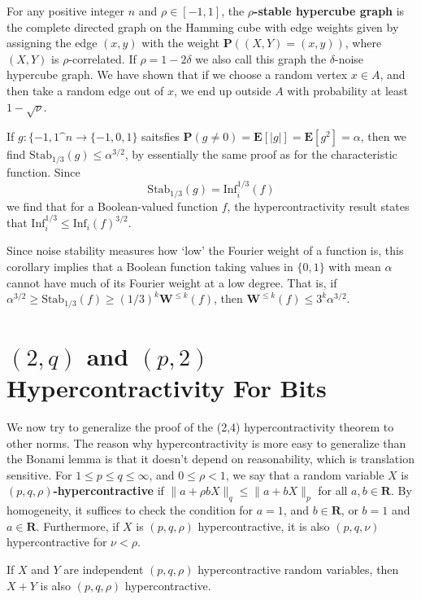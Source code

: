 \begin{example}
    For any positive integer $n$ and $\rho \in [-1,1]$, the {\bf $\rho$-stable hypercube graph} is the complete directed graph on the Hamming cube with edge weights given by assigning the edge $(x,y)$ with the weight $\mathbf{P}((X,Y) = (x,y))$, where $(X,Y)$ is $\rho$-correlated. If $\rho = 1 - 2\delta$ we also call this graph the $\delta$-noise hypercube graph. We have shown that if we choose a random vertex $x \in A$, and then take a random edge out of $x$, we end up outside $A$ with probability at least $1 - \sqrt{\nu}$.
\end{example}

If $g: \{ -1, 1 \^n \to \{ -1, 0 ,1 \}$ saitsfies $\mathbf{P}(g \neq 0) = \mathbf{E}[|g|] = \mathbf{E}[g^2] = \alpha$, then we find $\text{Stab}_{1/3}(g) \leq \alpha^{3/2}$, by essentially the same proof as for the characteristic function. Since
%
\[ \text{Stab}_{1/3}(g) = \text{Inf}_i^{1/3}(f) \]
%
we find that for a Boolean-valued function $f$, the hypercontractivity result states that $\text{Inf}_i^{1/3} \leq \text{Inf}_i(f)^{3/2}$.

Since noise stability measures how `low' the Fourier weight of a function is, this corollary implies that a Boolean function taking values in $\{ 0, 1 \}$ with mean $\alpha$ cannot have much of its Fourier weight at a low degree. That is, if $\alpha^{3/2} \geq \text{Stab}_{1/3}(f) \geq (1/3)^k \mathbf{W}^{\leq k}(f)$, then $\mathbf{W}^{\leq k}(f) \leq 3^k \alpha^{3/2}$.

\section{$(2,q)$ and $(p,2)$ Hypercontractivity For Bits}

We now try to generalize the proof of the (2,4) hypercontractivity theorem to other norms. The reason why hypercontractivity is more easy to generalize than the Bonami lemma is that it doesn't depend on reasonability, which is translation sensitive. For $1 \leq p \leq q \leq \infty$, and $0 \leq \rho < 1$, we say that a random variable $X$ is {\bf $(p,q,\rho)$-hypercontractive} if $\| a + \rho b X \|_q \leq \| a + b X \|_p$ for all $a,b \in \mathbf{R}$. By homogeneity, it suffices to check the condition for $a = 1$, and $b \in \mathbf{R}$, or $b = 1$ and $a \in \mathbf{R}$. Furthermore, if $X$ is $(p,q,\rho)$ hypercontractive, it is also $(p,q,\nu)$ hypercontractive for $\nu < \rho$.

\begin{theorem}
    If $X$ and $Y$ are independent $(p,q,\rho)$ hypercontractive random variables, then $X + Y$ is also $(p,q,\rho)$ hypercontractive.
\end{theorem}

